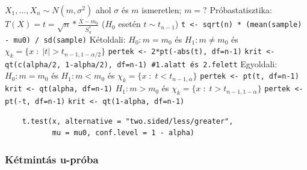 \documentclass[12pt,a4paper]{article}
\begin{document}
\begin{outline}
	\1 $X_1,...,X_n \sim N(m,\sigma^2)$ ahol $\sigma$ és $m$ ismeretlen; $m=?$
	\1 Próbastatisztika: $T(X) = t = \sqrt{n}*\frac{\overline{X} - m_0}{S^*_n}$
	\;\; ($H_0$ esetén $t \sim t_{n-1}$)
		\2 \texttt{t <- sqrt(n) * (mean(sample) - mu0) / sd(sample)}
	\1 Kétoldali: $H_0: m = m_0$ és $H_1: m \ne m_0$
	és $\chi_k = \{ x \;:\; |t| > t_{n-1,1-\alpha/2} \}$
		\2 \texttt{pertek <- 2*pt(-abs(t), df=n-1)}
		\2 \texttt{krit <- qt(c(alpha/2, 1-alpha/2), df=n-1) \#1.alatt és 2.felett}
	\1 Egyoldali: $H_0: m = m_0$ és 
		\2 $H_1: m < m_0$ és $\chi_k = \{ x \;:\; t < t_{n-1,\alpha} \}$
			\3 \texttt{pertek <- pt(t, df=n-1)}
			\3 \texttt{krit <- qt(alpha, df=n-1)}
		\2 $H_1: m > m_0$ és $\chi_k = \{ x \;:\; t > t_{n-1,1-\alpha} \}$
			\3 \texttt{pertek <- pt(-t, df=n-1)}
			\3 \texttt{krit <- qt(1-alpha, df=n-1)}
	\1 \begin{verbatim}
	t.test(x, alternative = "two.sided/less/greater",
	       mu = mu0, conf.level = 1 - alpha)
	\end{verbatim}
\end{outline}

\pagebreak

\subsubsection{Kétmintás u-próba}
\label{sec:próba-2minta-u}
\end{document}

